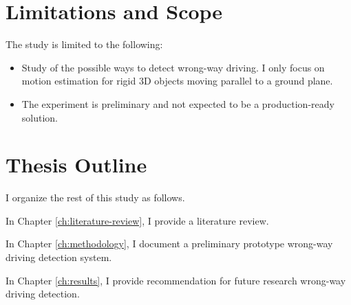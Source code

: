 \section{Limitations and Scope}
The study is limited to the following:
\begin{itemize}
  \item Study of the possible ways to detect wrong-way driving. I only focus on motion estimation for rigid 3D objects moving parallel to a ground plane.
  \item The experiment is preliminary and not expected to be a production-ready solution.
\end{itemize}


\section{Thesis Outline}

I organize the rest of this study as follows.

In Chapter \ref{ch:literature-review}, I provide a literature review.

In Chapter \ref{ch:methodology}, I document a preliminary prototype wrong-way driving detection system.

In Chapter \ref{ch:results}, I provide recommendation for future research wrong-way driving detection.



\FloatBarrier
